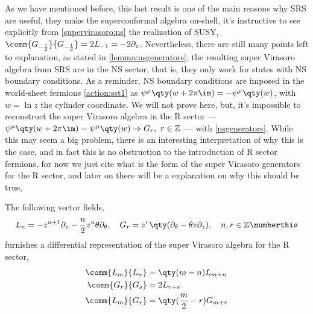 As we have mentioned before, this last result is one of the main reasons why SRS are useful, they make the superconformal algebra 
on-shell, it's instructive to see explicitly from \cref{supervirasoro:ns} the realization of SUSY, $\comm{G_{-\frac12}}{G_{-\frac12}}=2L_{-1}=-2\partial_z$. Nevertheless, there are still many points left to explanation, as stated in \cref{lemma:nsgenerators}, the 
resulting super Virasoro algebra from SRS are in the NS sector, that is, they only work for states with NS boundary conditions. 
As a reminder, NS boundary conditions are imposed in the world-sheet fermions \eqref{action:sst1} as $\psi^\mu\qty(w+2\pi\im)=-\psi^\mu\qty(w)$, 
with $w=\ln z$ the cylinder coordinate. We will not prove here, but, it's impossible to reconstruct the super Virasoro 
algebra in the R sector --- $\psi^\mu\qty(w+2\pi\im)=\psi^\mu\qty(w)\Rightarrow G_r,\ r\in\mathbb Z$ --- with \eqref{nsgenerators}. 
While this may seem a big problem, there is an interesting interpretation of why this is the case, and in fact this is no obstruction 
to the introduction of R sector fermions, for now we just cite what is the form of the super 
Virasoro generators for the R sector, and later on there will be a explanation on why this should be true,
\begin{lemma}
    The following vector fields, \[L_n=-z^{n+1}\partial_z-\frac n2z^n\theta\partial_\theta,\ \ \ G_r=z^r\qty(\partial_\theta-\theta z\partial_z),\ \ \ n,r\in\mathbb Z\numberthis\label{rgenerators}\] 
    furnishes a differential representation of the super Virasoro algebra for the R sector,
    \begin{subequations}\begin{align}
        \comm{L_m}{L_n}&=\qty(m-n)L_{m+n}\\
        \comm{G_r}{G_s}&=2L_{r+s}\\
        \comm{L_m}{G_r}&=\qty(\frac m2-r)G_{m+r}
    \end{align}\label{supervirasoro:r}\end{subequations}
\end{lemma}
